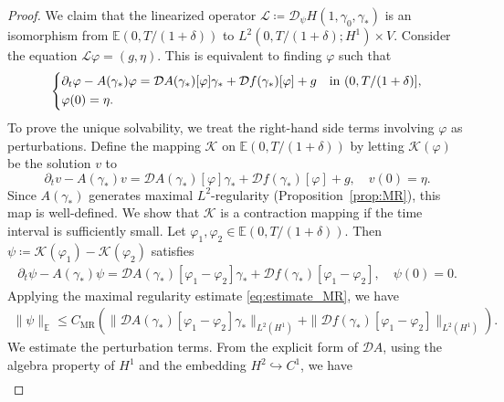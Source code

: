 \documentclass{article}
\theoremstyle{remark}
\theoremstyle{definition}
\numberwithin{equation}{section}
\begin{document}
\begin{proof}
    We claim that the linearized operator $\mathcal{L} \coloneqq \mathcal{D}_\psi H(1, \gamma_0, \gamma_*)$ is an isomorphism from $\mathbb{E}(0,T/(1+\delta))$ to $L^2(0,T/(1+\delta);H^1) \times V$.
    Consider the equation $\mathcal{L}\varphi = (g, \eta)$. This is equivalent to finding $\varphi$ such that
    \begin{equation} \label{eq:reg-eq}
        \begin{dcases*}
            \partial_t \varphi - A(\gamma_\ast)\varphi = \mathcal{D}A(\gamma_\ast)[\varphi]\gamma_\ast + \mathcal{D}f(\gamma_\ast)[\varphi] + g & in $(0,T/(1+\delta)]$,\\
            \varphi(0) = \eta.
        \end{dcases*}
    \end{equation}
    To prove the unique solvability, we treat the right-hand side terms involving $\varphi$ as perturbations.
    Define the mapping $\mathcal{K}$ on $\mathbb{E}(0,T/(1+\delta))$ by letting $\mathcal{K}(\varphi)$ be the solution $v$ to
    \begin{equation*}
        \partial_t v - A(\gamma_\ast)v = \mathcal{D}A(\gamma_\ast)[\varphi]\gamma_\ast + \mathcal{D}f(\gamma_\ast)[\varphi] + g, \quad v(0) = \eta.
    \end{equation*}
    Since $A(\gamma_\ast)$ generates maximal $L^2$-regularity (Proposition~\ref{prop:MR}), this map is well-defined.
    We show that $\mathcal{K}$ is a contraction mapping if the time interval is sufficiently small.
    Let $\varphi_1, \varphi_2 \in \mathbb{E}(0,T/(1+\delta))$. Then $\psi \coloneqq \mathcal{K}(\varphi_1) - \mathcal{K}(\varphi_2)$ satisfies
    \begin{align*}
        \partial_t \psi - A(\gamma_\ast)\psi = \mathcal{D}A(\gamma_\ast)[\varphi_1 - \varphi_2]\gamma_\ast + \mathcal{D}f(\gamma_\ast)[\varphi_1 - \varphi_2], \quad \psi(0) = 0.
    \end{align*}
    Applying the maximal regularity estimate \eqref{eq:estimate_MR}, we have
    \begin{align*}
        \|\psi\|_{\mathbb{E}} \le C_{\mathrm{MR}} \left( \|\mathcal{D}A(\gamma_\ast)[\varphi_1 - \varphi_2]\gamma_\ast\|_{L^2(H^1)} + \|\mathcal{D}f(\gamma_\ast)[\varphi_1 - \varphi_2]\|_{L^2(H^1)} \right).
    \end{align*}
    We estimate the perturbation terms.
    From the explicit form of $\mathcal{D}A$, using the algebra property of $H^1$ and the embedding $H^2 \hookrightarrow C^1$, we have
    \begin{align*}

\end{align*}
\end{proof}
\end{document}
